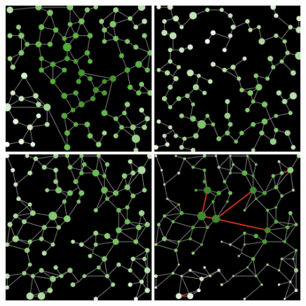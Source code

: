 \documentclass[graybox]{svmult}
\begin{document}
\begin{figure}
	\centering
	\includegraphics[width=0.49\textwidth]{setup_stylized.png}\hspace{0.1cm}
	\includegraphics[width=0.49\textwidth]{setup_synth_0.png}\\\vspace{0.1cm}
	\includegraphics[width=0.49\textwidth]{setup_synth_1.png}\hspace{0.1cm}
	\includegraphics[width=0.49\textwidth]{setup_synth_1_tick100.png}

\end{figure}
\end{document}
